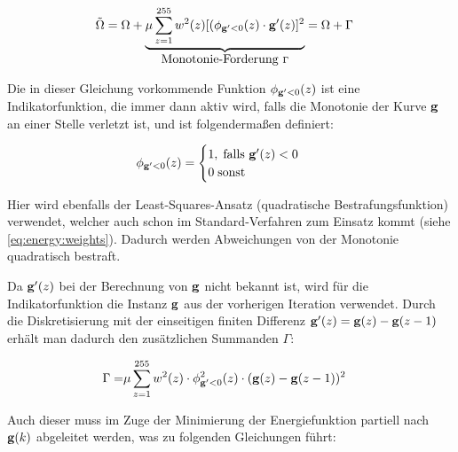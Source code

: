 \begin{align}
\tilde{\Omega} &= \Omega + \underbrace{\mu \sum \limits_{z=1}^{255} w^2(z) [(\phi_{\mathbf g'<0}(z)\cdot \mathbf g'(z)]^2}_{\mbox{Monotonie-Forderung } \Gamma} = \Omega + \Gamma
\end{align}

Die in dieser Gleichung vorkommende Funktion $\phi_{\mathbf g'<0}(z)$ ist eine Indikatorfunktion, die immer dann aktiv wird, falls die Monotonie der Kurve $\mathbf g$ an einer Stelle verletzt ist, und ist folgendermaßen definiert: 

\begin{align}
\phi_{\mathbf g'<0}(z) &= 
    \begin{cases} 
        1, \; \mbox{falls } \mathbf g'(z) < 0\\ 
        0 \; \mbox{sonst}
    \end{cases}
\end{align}

Hier wird ebenfalls der Least-Squares-Ansatz (quadratische Bestrafungsfunktion) verwendet, welcher auch schon im Standard-Verfahren zum Einsatz kommt (siehe \autoref{eq:energy:weights}). Dadurch werden Abweichungen von der Monotonie quadratisch bestraft. 

Da $\mathbf g'(z)$ bei der Berechnung von $\mathbf g$ nicht bekannt ist, wird für die Indikatorfunktion die Instanz $\mathbf g$ aus der vorherigen Iteration verwendet. Durch die Diskretisierung mit der einseitigen finiten Differenz $\mathbf g'(z) = \mathbf g(z)-\mathbf g(z-1)$ erhält man dadurch den zusätzlichen Summanden $\Gamma$:

\begin{align}
\Gamma = & \mu \sum_{z=1}^{255} w^2(z) \cdot \phi^2_{\mathbf g'<0}(z) \cdot (\mathbf g(z)- \mathbf g(z-1))^2
\end{align}

Auch dieser muss im Zuge der Minimierung der Energiefunktion partiell nach $\mathbf g(k)$ abgeleitet werden, was zu folgenden Gleichungen führt:

